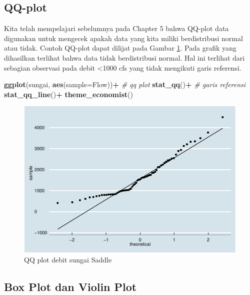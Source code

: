 \documentclass[]{book}
\newenvironment{Shaded}{\begin{snugshade}}{\end{snugshade}}
\newcommand{\KeywordTok}[1]{\textcolor[rgb]{0.13,0.29,0.53}{\textbf{#1}}}
\newcommand{\DataTypeTok}[1]{\textcolor[rgb]{0.13,0.29,0.53}{#1}}
\newcommand{\StringTok}[1]{\textcolor[rgb]{0.31,0.60,0.02}{#1}}
\newcommand{\CommentTok}[1]{\textcolor[rgb]{0.56,0.35,0.01}{\textit{#1}}}
\newcommand{\OperatorTok}[1]{\textcolor[rgb]{0.81,0.36,0.00}{\textbf{#1}}}
\newcommand{\NormalTok}[1]{#1}
\begin{document}
\subsection{QQ-plot}\label{qq-plot-2}

Kita telah mempelajari sebelumnya pada Chapter 5 bahwa QQ-plot data
digunakan untuk mengecek apakah data yang kita miliki berdistribusi
normal atau tidak. Contoh QQ-plot dapat dilijat pada Gambar
\ref{fig:qqeda}. Pada grafik yang dihasilkan terlihat bahwa data tidak
berdistribusi normal. Hal ini terlihat dari sebagian observasi pada
debit \textless{}1000 cfs yang tidak mengikuti garis referensi.

\begin{Shaded}
\begin{Highlighting}[]
\KeywordTok{ggplot}\NormalTok{(sungai, }\KeywordTok{aes}\NormalTok{(}\DataTypeTok{sample=}\NormalTok{Flow))}\OperatorTok{+}
\StringTok{  }\CommentTok{# qq plot}
\StringTok{  }\KeywordTok{stat_qq}\NormalTok{()}\OperatorTok{+}
\StringTok{  }\CommentTok{# garis referensi}
\StringTok{  }\KeywordTok{stat_qq_line}\NormalTok{()}\OperatorTok{+}
\StringTok{  }\KeywordTok{theme_economist}\NormalTok{()}
\end{Highlighting}
\end{Shaded}

\begin{figure}

{\centering \includegraphics[width=0.7\linewidth]{EnvStat_files/figure-latex/qqeda-1} 

}

\caption{QQ plot debit sungai Saddle}\label{fig:qqeda}
\end{figure}

\subsection{Box Plot dan Violin Plot}\label{box-plot-dan-violin-plot-1}
\end{document}
